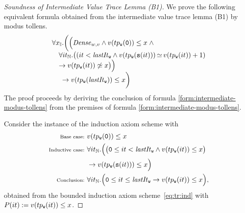 \begin{proof}[Soundness of Intermediate Value Trace Lemma (B1)]
	We prove the following equivalent formula obtained from the
	intermediate value trace lemma (B1) by modus tollens.
	\begin{equation}
	\label{form:intermediate-modus-tollens}
	\begin{array}{l}
	\hspace*{-1.5em}\forall x_\Int. \bigg(
	\Big(
	\mathit{Dense}_{w,v} \land
	v(tp_\pv{w}(\zero)) \leq x \;\land 
	\\
	\hspace*{-.5em}\forall it_\Nat.\big(
	(
	it < \mathit{lastIt}_\pv{w}
	\land
	v(tp_\pv{w}(\suc(it))) \eql v(tp_\pv{w}(it)) + 1
	) 
	\\
	\hspace*{-.5em}	\limp
	v(tp_\pv{w}(it)) \neql x
	\big)
	\Big)\\
	\limp 
	v(tp_\pv{w}(\mathit{lastIt}_\pv{w})) \leq x
	\bigg)
	\end{array}\hspace*{-2em}
	\end{equation}
	The proof proceeds by deriving the conclusion of formula \eqref{form:intermediate-modus-tollens} from the premises of formula 
	\eqref{form:intermediate-modus-tollens}.
	
	Consider the instance of the induction axiom scheme with
	\begin{subequations}	
		\begin{align}
		\text{{\scriptsize Base case: }}&v(tp_\pv{w}(\zero)) \leq x 
		\label{form:intermediate-axiom-a}\\
		\text{{\scriptsize Inductive case: }}&\forall it_\Nat. 
		\Big(\big(\zero \leq it < \mathit{lastIt}_\pv{w} \land v(tp_\pv{w}(it)) \leq x \big) \label{form:intermediate-axiom-b} 
		\\ &\limp v(tp_\pv{w}(\suc(it))) \leq x \Big)  \nonumber \\
		\hspace*{-1em}\text{{\scriptsize Conclusion: }}&\forall it_\Nat. \Big(\zero \leq it \leq \mathit{lastIt}_\pv{w} \limp v(tp_\pv{w}(it)) \leq x \Big),\hspace*{-2em}	\label{form:intermediate-axiom-c}
		\end{align}
	\end{subequations} 
	obtained from the bounded induction axiom
	scheme~\eqref{eq:tr:ind} with $P(it) := v(tp_{\texttt{w}}(it)) \leq x$. %
	

\end{proof}
